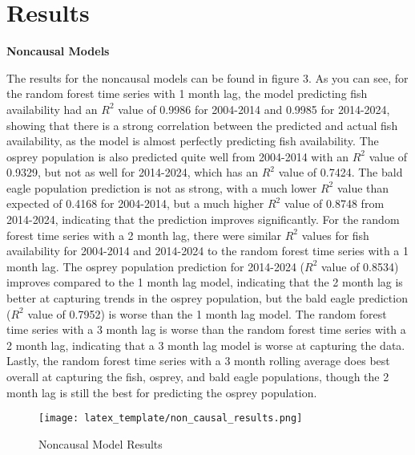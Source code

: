 \documentclass{article}
\begin{document}
\section{Results}
\textbf{Noncausal Models}

The results for the noncausal models can be found in figure 3. As you can see, for the random forest time series with 1 month lag, the model predicting fish availability had an $R^2$ value of 0.9986 for 2004-2014 and 0.9985 for 2014-2024, showing that there is a strong correlation between the predicted and actual fish availability, as the model is almost perfectly predicting fish availability. The osprey population is also predicted quite well from 2004-2014 with an $R^2$ value of 0.9329, but not as well for 2014-2024, which has an $R^2$ value of 0.7424. The bald eagle population prediction is not as strong, with a much lower $R^2$ value than expected of 0.4168 for 2004-2014, but a much higher $R^2$ value of 0.8748 from 2014-2024, indicating that the prediction improves significantly. For the random forest time series with a 2 month lag, there were similar $R^2$ values for fish availability for 2004-2014 and 2014-2024 to the random forest time series with a 1 month lag. The osprey population prediction for 2014-2024 ($R^2$ value of 0.8534) improves compared to the 1 month lag model, indicating that the 2 month lag is better at capturing trends in the osprey population, but the bald eagle prediction ($R^2$ value of 0.7952) is worse than the 1 month lag model. The random forest time series with a 3 month lag is worse than the random forest time series with a 2 month lag, indicating that a 3 month lag model is worse at capturing the data. Lastly, the random forest time series with a 3 month rolling average does best overall at capturing the fish, osprey, and bald eagle populations, though the 2 month lag is still the best for predicting the osprey population. 

\begin{figure}[htbp]
\centerline{\texttt{[image: latex\_template/non\_causal\_results.png]}}
\caption{Noncausal Model Results}
\label{fig}
\end{figure} 
\end{document}
